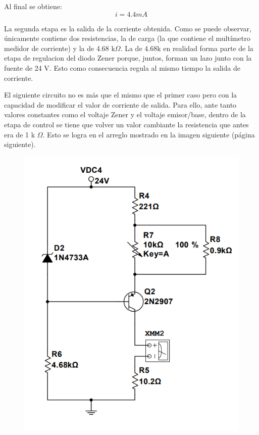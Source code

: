 \documentclass{article}
\begin{document}
Al final se obtiene:
\[ i = 4.4 mA \]

La segunda etapa es la salida de la corriente obtenida. Como se puede observar, únicamente contiene dos resistencias, la de
carga (la que contiene el multímetro medidor de corriente) y la de 4.68 k\(\Omega\). La de 4.68k en realidad forma parte de
la etapa de regulacion del diodo Zener porque, juntos, forman un lazo junto con la fuente de 24 V. Esto como consecuencia regula
al mismo tiempo la salida de corriente.

El siguiente circuito no es más que el mismo que el primer caso pero con la capacidad de modificar el valor de corriente de salida.
Para ello, ante tanto valores constantes como el voltaje Zener y el voltaje emisor/base, dentro de la etapa de control se tiene
que volver un valor cambiante la resistencia que antes era de 1 k \(\Omega\). Esto se logra en el arreglo mostrado en la imagen 
siguiente (página siguiente).

\begin{figure}[h]
    \centering
    \includegraphics[scale=0.6]{casoB.png}
    \label{Fuente de corriente de 4 a 20 mA}
\end{figure}
\end{document}
